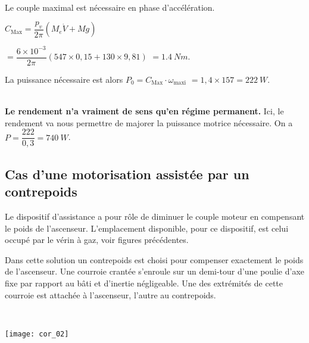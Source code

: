 \begin{multicols}{2}
\ifprof
\begin{corrige}~\\
Le couple maximal est nécessaire en phase d’accélération.

$C_{\text{Max}} = \dfrac{p_v}{2\pi}\left(M_e \dot{V} +Mg\right) $ 

$=\dfrac{6\times 10^{-3}}{2\pi}\left(547 \times 0,15 +130 \times 9,81\right)$ $=\SI{1,4}{Nm}$.

La puissance nécessaire est alors $P_0 = C_{\text{Max}}  \cdot \omega_{\text{maxi}}$ $=1,4\times 157 =\SI{222}{W}$.
\end{corrige}
\else
\fi


\ifprof
\begin{corrige}~\\
\textbf{Le rendement n'a vraiment de sens qu'en régime permanent.}
Ici, le rendement va nous permettre de majorer la puissance motrice nécessaire.
On a $P=\dfrac{222}{0,3}= \SI{740}{W}$.
\end{corrige}
\else
\fi



\subsection*{Cas d’une motorisation assistée par un contrepoids}

\ifprof
\else
Le dispositif d’assistance a pour rôle de diminuer le couple moteur en compensant le poids de l’ascenseur. L’emplacement disponible, pour ce dispositif, est celui occupé par le vérin à gaz, voir figures précédentes.

Dans cette solution un contrepoids est choisi pour compenser exactement
le poids de l’ascenseur. Une courroie crantée s’enroule sur un demi-tour d’une
poulie d’axe fixe par rapport au bâti et d'inertie négligeable. Une des extrémités de cette courroie est
attachée à l’ascenseur, l’autre au contrepoids.
\fi

\ifprof
\begin{corrige}~\\
\begin{center}
\texttt{[image: cor\_02]}
\end{center}


\end{corrige}
\end{multicols}
